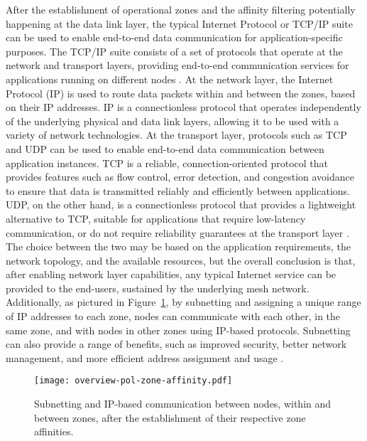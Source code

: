 After the establishment of operational zones and the affinity filtering potentially happening at the data link layer, the typical Internet Protocol or TCP/IP suite can be used to enable end-to-end data communication for application-specific purposes. The TCP/IP suite consists of a set of protocols that operate at the network and transport layers, providing end-to-end communication services for applications running on different nodes \cite{peterson2007computer}. At the network layer, the Internet Protocol (IP) is used to route data packets within and between the zones, based on their IP addresses. IP is a connectionless protocol that operates independently of the underlying physical and data link layers, allowing it to be used with a variety of network technologies. At the transport layer, protocols such as TCP and UDP can be used to enable end-to-end data communication between application instances. TCP is a reliable, connection-oriented protocol that provides features such as flow control, error detection, and congestion avoidance to ensure that data is transmitted reliably and efficiently between applications. UDP, on the other hand, is a connectionless protocol that provides a lightweight alternative to TCP, suitable for applications that require low-latency communication, or do not require reliability guarantees at the transport layer \cite{peterson2007computer}. The choice between the two may be based on the application requirements, the network topology, and the available resources, but the overall conclusion is that, after enabling network layer capabilities, any typical Internet service can be provided to the end-users, sustained by the underlying mesh network. Additionally, as pictured in Figure~\ref{fig:proof-of-location-overview-pol-zone-affinity}, by subnetting and assigning a unique range of IP addresses to each zone, nodes can communicate with each other, in the same zone, and with nodes in other zones using IP-based protocols. Subnetting can also provide a range of benefits, such as improved security, better network management, and more efficient address assignment and usage \cite{peterson2007computer}.

\begin{figure}[h!]
    \begin{center}
    \texttt{[image: overview-pol-zone-affinity.pdf]}
    \caption{Subnetting and IP-based communication between nodes, within and between zones, after the establishment of their respective zone affinities.}
    \label{fig:proof-of-location-overview-pol-zone-affinity}
    \end{center}
\end{figure}

